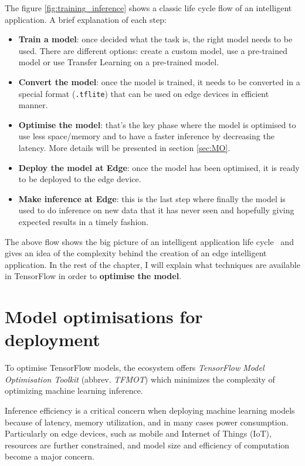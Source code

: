 The figure \autoref{fig:training_inference} shows a classic life cycle flow of
an intelligent application. A brief explanation of each step:

\begin{itemize}
    \item \textbf{Train a model}: once decided what the task is, the right
        model needs to be used. There are different options: create a custom
        model, use a pre-trained model or use Transfer Learning on a
        pre-trained model.
    \item \textbf{Convert the model}: once the model is trained, it needs to be
        converted in a special format (\texttt{.tflite}) that can be used on
        edge devices in efficient manner.
    \item \textbf{Optimise the model}: that's the key phase where the model is
        optimised to use less space/memory and to have a faster inference by
        decreasing the latency. More details will be presented in section
        \autoref{sec:MO}.
    \item \textbf{Deploy the model at Edge}: once the model has been optimised,
        it is ready to be deployed to the edge device.
    \item \textbf{Make inference at Edge}: this is the last step where finally
        the model is used to do inference on new data that it has never seen
        and hopefully giving expected results in a timely fashion.
\end{itemize}

The above flow shows the big picture of an intelligent application life
cycle~\cite{tflite:intro} and gives an idea of the complexity behind the
creation of an edge intelligent application.
In the rest of the chapter, I will explain what techniques are available in
TensorFlow in order to \textbf{optimise the model}.

\section{Model optimisations for deployment}\label{sec:MO}

To optimise TensorFlow models, the ecosystem offers \textit{TensorFlow Model
Optimisation Toolkit} (abbrev. \textit{TFMOT}) which minimizes the complexity
of optimizing machine learning inference.

Inference efficiency is a critical concern when deploying machine learning
models because of latency, memory utilization, and in many cases power
consumption. Particularly on edge devices, such as mobile and Internet of
Things (IoT), resources are further constrained, and model size and efficiency
of computation become a major concern.

